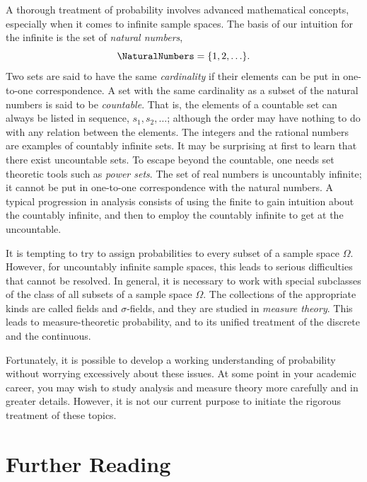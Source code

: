 A thorough treatment of probability involves advanced mathematical concepts, especially when it comes to infinite sample spaces.
The basis of our intuition for the infinite is the set of \emph{natural numbers},
\begin{equation*}
\NaturalNumbers = \{ 1, 2, \ldots \}.
\end{equation*}
Two sets are said to have the same \emph{cardinality} if their elements can be put in one-to-one correspondence.
A set with the same cardinality as a subset of the natural numbers is said to be \emph{countable}.
That is, the elements of a countable set can always be listed in sequence, $s_1, s_2, \ldots$; although the order may have nothing to do with any relation between the elements.
The integers and the rational numbers are examples of countably infinite sets.
It may be surprising at first to learn that there exist uncountable sets.
To escape beyond the countable, one needs set theoretic tools such as \emph{power sets}.
The set of real numbers is uncountably infinite; it cannot be put in one-to-one correspondence with the natural numbers.
A typical progression in analysis consists of using the finite to gain intuition about the countably infinite, and then to employ the countably infinite to get at the uncountable.

It is tempting to try to assign probabilities to every subset of a sample space $\Omega$.
However, for uncountably infinite sample spaces, this leads to serious difficulties that cannot be resolved.
In general, it is necessary to work with special subclasses of the class of all subsets of a sample space $\Omega$.
The collections of the appropriate kinds are called fields and $\sigma$-fields, and they are studied in \emph{measure theory}.
This leads to measure-theoretic probability, and to its unified treatment of the discrete and the continuous.

Fortunately, it is possible to develop a working understanding of probability without worrying excessively about these issues.
At some point in your academic career, you may wish to study analysis and measure theory more carefully and in greater details.
However, it is not our current purpose to initiate the rigorous treatment of these topics.


\section*{Further Reading}

